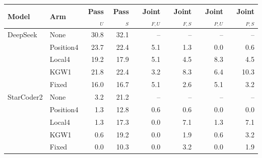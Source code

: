 \begin{tabular}{llrrrrrr}
\toprule
Model & Arm & Pass$_U$ & Pass$_S$ & Joint$_{F,U}$ & Joint$_{F,S}$ & Joint$_{P,U}$ & Joint$_{P,S}$ \\
\midrule
DeepSeek & None & 30.8 & 32.1 & -- & -- & -- & -- \\
 & Position4 & 23.7 & 22.4 & 5.1 & 1.3 & 0.0 & 0.6 \\
 & Local4 & 19.2 & 17.9 & 5.1 & 4.5 & 8.3 & 4.5 \\
 & KGW1 & 21.8 & 22.4 & 3.2 & 8.3 & 6.4 & 10.3 \\
 & Fixed & 16.0 & 16.7 & 5.1 & 2.6 & 5.1 & 3.2 \\
StarCoder2 & None & 3.2 & 21.2 & -- & -- & -- & -- \\
 & Position4 & 1.3 & 12.8 & 0.6 & 0.6 & 0.0 & 0.0 \\
 & Local4 & 1.3 & 17.3 & 0.0 & 7.1 & 1.3 & 7.1 \\
 & KGW1 & 0.6 & 19.2 & 0.0 & 1.9 & 0.6 & 3.2 \\
 & Fixed & 0.0 & 10.3 & 0.0 & 3.2 & 0.0 & 1.9 \\
\bottomrule
\end{tabular}
